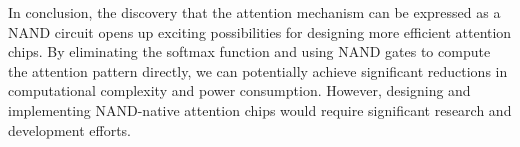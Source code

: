 In conclusion, the discovery that the attention mechanism can be expressed as a NAND circuit opens up exciting possibilities for designing more efficient attention chips. By eliminating the softmax function and using NAND gates to compute the attention pattern directly, we can potentially achieve significant reductions in computational complexity and power consumption. However, designing and implementing NAND-native attention chips would require significant research and development efforts.





























































